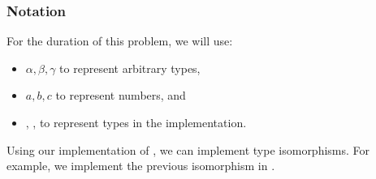 \documentclass[11pt]{article}
\begin{document}
\subsubsection{Notation}

For the duration of this problem, we will use:
\begin{itemize}
  \item $\alpha, \beta, \gamma$ to represent arbitrary types,
  \item $a, b, c$ to represent numbers, and
  \item {}, ,  to represent types in the \LangPSF{} implementation.
\end{itemize}

Using our implementation of \LangPSF{}, we can implement type isomorphisms.
For example, we implement the previous isomorphism in .

\newcommand{\rownumber}{\stepcounter{rownumber}\arabic{rownumber}.}
\end{document}

